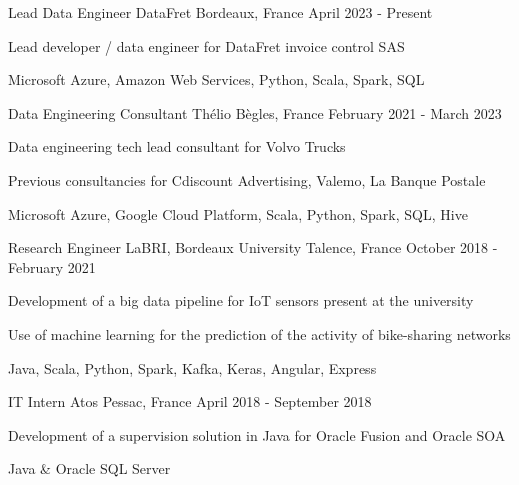 
\begin{cventries}

	\cventry
	{Lead Data Engineer}
	{DataFret}
	{Bordeaux, France}
	{April 2023 - Present}
	{
		\begin{cvitems}
			\item {Lead developer / data engineer for DataFret invoice control SAS}
			\item {Microsoft Azure, Amazon Web Services, Python, Scala, Spark, SQL}
		\end{cvitems}
	}

	\cventry
	{Data Engineering Consultant}
	{Thélio}
	{Bègles, France}
	{February 2021 - March 2023}
	{
		\begin{cvitems}
			\item {Data engineering tech lead consultant for Volvo Trucks}
			\item {Previous consultancies for Cdiscount Advertising, Valemo, La Banque Postale}
			\item {Microsoft Azure, Google Cloud Platform, Scala, Python, Spark, SQL, Hive}
		\end{cvitems}
	}

	\cventry
	{Research Engineer}
	{LaBRI, Bordeaux University}
	{Talence, France}
	{October 2018 - February 2021}
	{
		\begin{cvitems}
			\item {Development of a big data pipeline for IoT sensors present at the university}
			\item {Use of machine learning for the prediction of the activity of bike-sharing networks}
			\item {Java, Scala, Python, Spark, Kafka, Keras, Angular, Express}
		\end{cvitems}
	}

	\cventry
	{IT Intern}
	{Atos}
	{Pessac, France}
	{April 2018 - September 2018}
	{
		\begin{cvitems}
			\item {Development of a supervision solution in Java for Oracle Fusion and Oracle SOA}
			\item {Java \& Oracle SQL Server}
		\end{cvitems}
	}

\end{cventries}